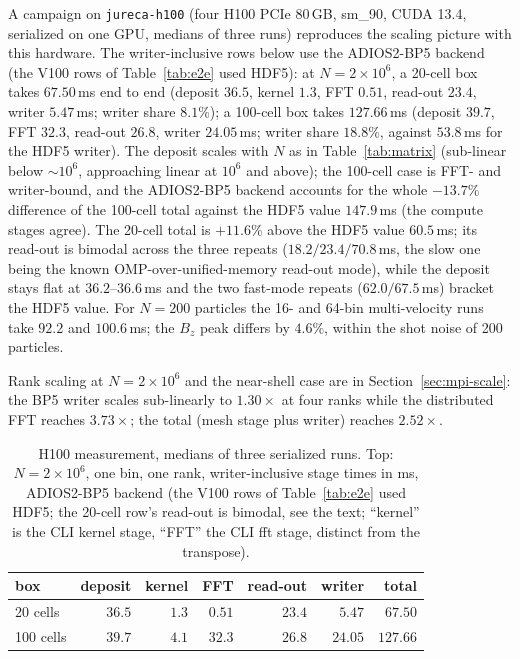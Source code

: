 A campaign on \texttt{jureca-h100} (four H100 PCIe 80\,GB, sm\_90,
CUDA 13.4, serialized on one GPU, medians of three runs) reproduces the
scaling picture with this hardware.  The writer-inclusive rows below
use the ADIOS2-BP5 backend (the V100 rows of Table~\ref{tab:e2e} used
HDF5): at $N=2\times10^{6}$, a 20-cell box takes $67.50$\,ms end to end (deposit
$36.5$, kernel $1.3$, FFT $0.51$, read-out $23.4$, writer $5.47$\,ms;
writer share $8.1\%$); a 100-cell box takes $127.66$\,ms (deposit $39.7$, FFT $32.3$,
read-out $26.8$, writer $24.05$\,ms; writer share $18.8\%$, against
$53.8$\,ms for the HDF5 writer).  The deposit scales with
$N$ as in Table~\ref{tab:matrix} (sub-linear below $\sim10^6$,
approaching linear at $10^6$ and above); the 100-cell case is FFT- and
writer-bound, and the ADIOS2-BP5 backend
accounts for the whole $-13.7\%$ difference of the 100-cell total
against the HDF5 value $147.9$\,ms (the compute stages agree).  The 20-cell
total is $+11.6\%$ above the HDF5 value $60.5$\,ms; its read-out is bimodal
across the three repeats ($18.2/23.4/70.8$\,ms, the slow one being the
known OMP-over-unified-memory read-out mode), while the deposit stays flat
at $36.2$--$36.6$\,ms and the two fast-mode repeats ($62.0/67.5$\,ms)
bracket the HDF5 value.  For $N=200$ particles the
16- and 64-bin multi-velocity runs take $92.2$ and $100.6$\,ms; the $B_z$
peak differs by $4.6\%$, within the shot noise of 200 particles.

Rank scaling at $N=2\times10^{6}$ and the near-shell case are in
Section~\ref{sec:mpi-scale}: the BP5 writer scales sub-linearly to
$1.30\times$ at four ranks while the distributed FFT reaches $3.73\times$;
the total (mesh stage plus writer) reaches $2.52\times$.

\begin{table}[t]
\centering
\small
\caption{H100 measurement, medians of three serialized runs.  Top:
$N=2\times10^{6}$, one bin, one rank, writer-inclusive stage times in ms,
ADIOS2-BP5 backend (the V100 rows of Table~\ref{tab:e2e} used HDF5; the
20-cell row's read-out is bimodal, see the text; ``kernel'' is the CLI
kernel stage,
``FFT'' the CLI fft stage, distinct from the transpose).}
\label{tab:h100}
\begin{tabular}{lrrrrrr}
\toprule
box & deposit & kernel & FFT & read-out & writer & total \\
\midrule
20 cells  & $36.5$ & $1.3$ & $0.51$ & $23.4$ & $5.47$  & $67.50$ \\
100 cells & $39.7$ & $4.1$ & $32.3$ & $26.8$ & $24.05$ & $127.66$ \\
\bottomrule
\end{tabular}

\end{table}
